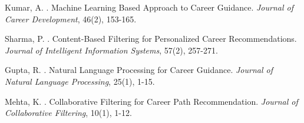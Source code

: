 \documentclass[12pt,a4paper]{article}
\begin{document}

\begin{thebibliography}{99}

Kumar, A. . Machine Learning Based Approach to Career Guidance. \emph{Journal of Career Development}, 46(2), 153-165.

Sharma, P. . Content-Based Filtering for Personalized Career Recommendations. \emph{Journal of Intelligent Information Systems}, 57(2), 257-271.

Gupta, R. . Natural Language Processing for Career Guidance. \emph{Journal of Natural Language Processing}, 25(1), 1-15.

Mehta, K. . Collaborative Filtering for Career Path Recommendation. \emph{Journal of Collaborative Filtering}, 10(1), 1-12.

\end{thebibliography}
\end{document}
